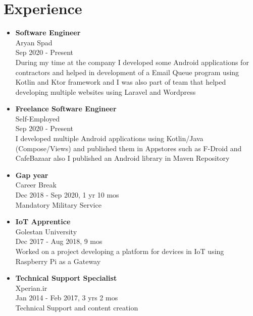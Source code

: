\section*{\LARGE{Experience}}
\begin{itemize}
    \item \large{\textbf{Software Engineer}\\Aryan Spad\\}\normalsize{Sep 2020 - Present\\During my time at the company I developed some Android applications for contractors and helped in development of a Email Queue program using Kotlin and Ktor framework and I was also part of team that helped developing multiple websites using Laravel and Wordpress}
    \item \large{\textbf{Freelance Software Engineer}\\Self-Employed\\}\normalsize{Sep 2020 - Present\\I developed multiple Android applications using Kotlin/Java (Compose/Views) and published them in Appstores such as F-Droid and CafeBazaar also I published an Android library in Maven Repository}
    \item \large{\textbf{Gap year}\\Career Break\\}\normalsize{Dec 2018 - Sep 2020}, 1 yr 10 mos\\ Mandatory Military Service
    \item \large{\textbf{IoT Apprentice}\\Golestan University\\}\normalsize{Dec 2017 - Aug 2018, 9 mos\\Worked on a project developing a platform for devices in IoT using Raspberry Pi as a Gateway}
    \item \large{\textbf{Technical Support Specialist}\\Xperian.ir\\}\normalsize{Jan 2014 - Feb 2017, 3 yrs 2 mos\\Technical Support and content creation}
\end{itemize}